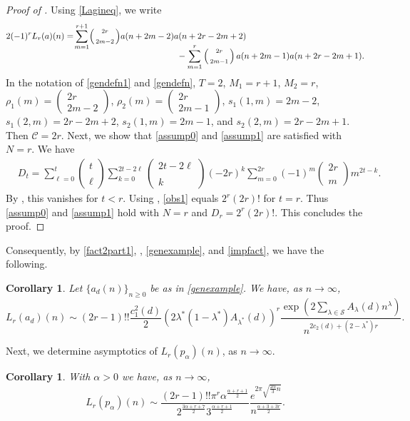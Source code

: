 \documentclass[11pt,reqno,a4paper]{amsart}
\renewcommand{\a}{\alpha}
\renewcommand{\l}{\lambda}
\renewcommand{\(}{\left\(}
\renewcommand{\)}{\right\)}
\numberwithin{equation}{section}
\theoremstyle{plain}
\newtheorem{corollary}[theorem]{Corollary}
\theoremstyle{definition} %
\numberwithin{equation}{section}
\renewcommand{\binom}[2]{\left(\begin{smallmatrix}#1\\\\#2\end{smallmatrix}\right)}
\newcommand{\smallbinom}[2]{(\begin{smallmatrix}#1\\#2\end{smallmatrix})}
\begin{document}
\begin{proof}[Proof of ]
Using \eqref{Lagineq}, we write 
\begin{align*}
&2(-1)^rL_r(a)(n)
=\!\sum_{m=1}^{r+1}\!\binom{2r}{2m-2}\!a(n+2m-2)a(n+2r-2m+2)\nonumber\\[-10 pt]
&\hspace{7 cm}-\sum_{m=1}^{r}\binom{2r}{2m-1}a(n+2m-1)a(n+2r-2m+1).
\end{align*}
 In the notation of \eqref{gendefn1} and \eqref{gendefn}, $T=2$, $M_1=r+1$, $M_2=r$, $\rho_1(m)=\smallbinom{2r}{2m-2}$, $\rho_2(m)=\smallbinom{2r}{2m-1}$, $s_1(1,m)=2m-2$, $s_1(2,m)=2r-2m+2$, $s_2(1,m)=2m-1$, and $s_2(2,m)=2r-2m+1$. 
Then $\mathcal{C}=2r$. Next, we show that \ref{assump0} and \ref{assump1} are satisfied with $N=r$. We have
\begin{align}\label{obs1}
&%
D_t=\sum_{\ell=0}^{t}\binom{t}{\ell}\sum_{k=0}^{2t-2\ell}\binom{2t-2\ell}{k}(-2r)^k\sum_{m=0}^{2r}(-1)^m\binom{2r}{m}m^{2t-k}.
\end{align}
 By , this vanishes for $t<r$. Using , \eqref{obs1} equals $2^r(2r)!$ for $t=r$. Thus \ref{assump0} and \ref{assump1} hold with $N=r$ and $D_r=2^r(2r)!$. This concludes the proof.\qedhere 
\end{proof}



 Consequently, by  \ref{fact2part1}, , \eqref{genexample}, and \eqref{impfact}, we have the following. 

\begin{corollary}\label{newcor1}
Let $\{a_d(n)\}_{n\ge 0}$ be as in \eqref{genexample}. We have, as $n\to \infty$, 
\[
L_r(a_d)(n)\sim (2r-1)!!\frac{c_1^2(d)}{2}\left(2\l^*(1-\l^*)A_{\l^*}(d)\right)^r\frac{\exp\left(2\sum_{\l\in \mathcal{S}}A_{\l}(d)n^{\l}\right)}{n^{2c_2(d)+(2-\l^*)r}}.%
\]
\end{corollary}

Next, we determine asymptotics of $L_r(p_{\a})(n)$, as $n\to \infty$. 


\begin{corollary}\label{ex2}
	With $\a>0$ we have, as $n\to \infty$, 
	\[
	L_r(p_{\a})(n)\sim \frac{(2r-1)!!\pi^r\a^{\frac{\a+r+1}{2}} }{ 2^{\frac{3\a+r+7}{2}} 3^{\frac{\a+r+1}{2}} }\frac{e^{2\pi\sqrt{\frac{2\a}3 n}}}{n^{\frac{\a+3+3r}{2}}}.
	\]
\end{corollary}
\end{document}
